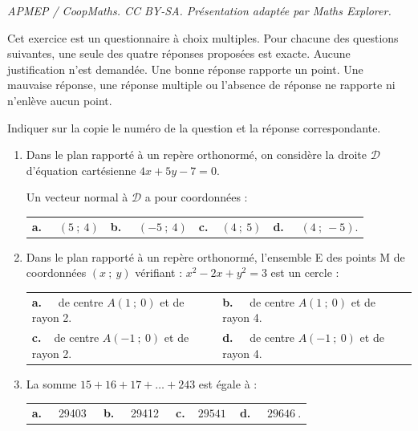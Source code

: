 \documentclass[10pt]{article}
\providecommand{\np}[2][]{{#2~#1}}
\begin{document}
\noindent\textit{APMEP / CoopMaths. CC BY-SA. Présentation adaptée par Maths Explorer.}\par\medskip
\medskip

Cet exercice est un questionnaire à choix multiples. Pour chacune des questions suivantes,
une seule des quatre réponses proposées est exacte. Aucune justification n'est demandée.
Une bonne réponse rapporte un point. Une mauvaise réponse, une réponse multiple ou
l'absence de réponse ne rapporte ni n'enlève aucun point.

Indiquer sur la copie le numéro de la question et la réponse correspondante.

\medskip

\begin{enumerate}
\item  Dans le plan rapporté à un repère orthonormé, on considère la droite $\mathcal{D}$ d'équation
cartésienne $4x + 5y - 7 = 0$.

Un vecteur normal à $\mathcal{D}$ a pour coordonnées :

\medskip

\begin{tabularx}{\linewidth}{*{4}{X}}
\textbf{a.~~} $(5~;~4) $ &\textbf{b.~~} $(-5~;~4) $&\textbf{c.~~}$(4~;~5) $& \textbf{d.~~} $(4~;~-5)  $.
\end{tabularx}

\medskip

 \item Dans le plan rapporté à un repère orthonormé, l'ensemble E des points M de coordonnées
$(x~;~y)$ vérifiant : $x^2 - 2x +y^2 = 3$ est un cercle :

\medskip

\begin{tabularx}{\linewidth}{*{2}{X}}
\textbf{a.~~} de centre $A(1~;~0)$ et de rayon 2.  &\textbf{b.~~}  de centre $ A(1~;~0)$ et de rayon 4.\\
\textbf{c.~~}de centre $ A(-1~;~0)$ et de rayon 2.& \textbf{d.~~} de centre $A(-1~;~0)$ et de rayon 4. 
\end{tabularx}

\item La somme $15 + 16 + 17 + \dots + 243$ est égale à :

\medskip

\begin{tabularx}{\linewidth}{*{4}{X}}
\textbf{a.~~} \np{29403} &\textbf{b.~~} \np{29412}&\textbf{c.~~}$\np{29541} $& \textbf{d.~~} $\np{29646}  $.
\end{tabularx}


\end{enumerate}
\end{document}
